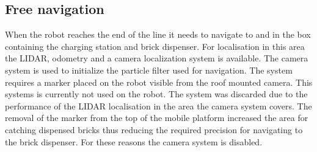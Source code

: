     \subsection{Free navigation} %
    \label{sub:mr_free_navigation}

    When the robot reaches the end of the line it needs to navigate  to and in the box containing the charging station and brick dispenser. For localisation in this area the LIDAR, odometry and a camera localization system is available. The camera system is used to initialize the particle filter used for navigation. The system requires a marker placed on the robot visible from the roof mounted  camera. This systems is currently not used on the robot. The system was discarded due to the performance of the LIDAR localisation in the area the camera system covers. The removal of the marker from the top of the mobile platform increased the area for catching dispensed bricks thus reducing the required precision for navigating to the brick dispenser. For these reasons the camera system is disabled. 
    
